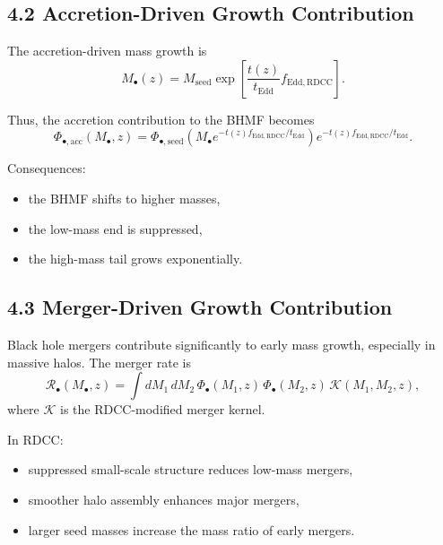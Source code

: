\documentclass[11pt,a4paper]{article}
\begin{document}
\subsection*{4.2 Accretion-Driven Growth Contribution}

The accretion-driven mass growth is
\begin{equation}
    M_{\bullet}(z)
    = M_{\mathrm{seed}}
      \exp\!\left[
        \frac{t(z)}{t_{\mathrm{Edd}}}
        f_{\mathrm{Edd,RDCC}}
      \right].
\end{equation}

Thus, the accretion contribution to the BHMF becomes
\begin{equation}
    \Phi_{\bullet,\mathrm{acc}}(M_{\bullet},z)
    = \Phi_{\bullet,\mathrm{seed}}
      \left(
        M_{\bullet}
        e^{-t(z) f_{\mathrm{Edd,RDCC}}/t_{\mathrm{Edd}}}
      \right)
      e^{-t(z) f_{\mathrm{Edd,RDCC}}/t_{\mathrm{Edd}}}.
\end{equation}

Consequences:

\begin{itemize}
    \item the BHMF shifts to higher masses,
    \item the low-mass end is suppressed,
    \item the high-mass tail grows exponentially.
\end{itemize}

\subsection*{4.3 Merger-Driven Growth Contribution}

Black hole mergers contribute significantly to early mass growth, especially in massive halos. 
The merger rate is
\begin{equation}
    \mathcal{R}_{\bullet}(M_{\bullet},z)
    = \int dM_{1}\, dM_{2}\,
      \Phi_{\bullet}(M_{1},z)\,
      \Phi_{\bullet}(M_{2},z)\,
      \mathcal{K}(M_{1},M_{2},z),
\end{equation}
where $\mathcal{K}$ is the RDCC-modified merger kernel.

In RDCC:

\begin{itemize}
    \item suppressed small-scale structure reduces low-mass mergers,
    \item smoother halo assembly enhances major mergers,
    \item larger seed masses increase the mass ratio of early mergers.
\end{itemize}
\end{document}
